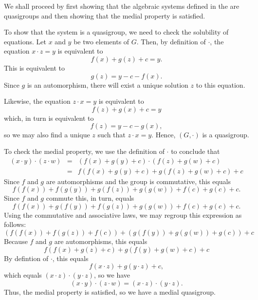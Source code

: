 \documentclass[12pt]{article}
\begin{document}
We shall proceed by first showing that the algebraic systems defined in the  are quasigroups and then showing that the medial property is satisfied.

To show that the system is a quasigroup, we need to check the solubility of equations.  Let $x$ and $y$ be two elements of $G$.  Then, by definition of $\cdot$, the equation $x \cdot z = y$ is equivalent to 
 \[ f(x) + g(z) + c = y .\]
This is equivalent to 
 \[g(z) = y - c - f(x).\]
Since $g$ is an automorphism, there will exist a unique solution $z$ to this equation.

Likewise, the equation $z \cdot x = y$ is equivalent to
 \[ f(z) + g(x) + c = y \]
which, in turn is equivalent to 
 \[f(z) = y - c - g(x),\]
so we may also find a unique $z$ such that $z \cdot x = y$.  Hence, $(G, \cdot)$ is a quasigroup.

To check the medial property, we use the definition of $\cdot$ to conclude that
\begin{eqnarray*} (x \cdot y) \cdot (z \cdot w) &=& (f(x) + g(y) + c) \cdot (f(z) + g(w) + c) \\ &=& f (f(x) + g(y) + c) + g (f(z) + g(w) + c) + c 
\end{eqnarray*}
Since $f$ and $g$ are automorphisms and the group is commutative, this equals
 \[ f(f(x)) + f(g(y)) + g(f(z)) + g(g(w)) + f(c) + g(c) + c .\]
Since $f$ and $g$ commute this, in turn, equals
 \[ f(f(x)) + g(f(y)) + f(g(z)) + g(g(w)) + f(c) + g(c) + c .\]
Using the commutative and associative laws, we may regroup this expression as follows:
 \[ (f(f(x)) + f(g(z)) + f(c)) + (g(f(y)) + g(g(w)) + g(c)) + c \]
Because $f$ and $g$ are automorphisms, this equals
 \[ f (f(x) + g(z) + c) + g( f(y) + g(w) + c) + c \]
By defintion of $\cdot$, this equals
 \[ f (x \cdot z) + g (y \cdot z) + c ,\]
which equals $(x \cdot z) \cdot (y \cdot z)$, so we have
 \[ (x \cdot y) \cdot (z \cdot w) = (x \cdot z) \cdot (y \cdot z). \]
Thus, the medial property is satisfied, so we have a medial quasigroup.
\end{document}
